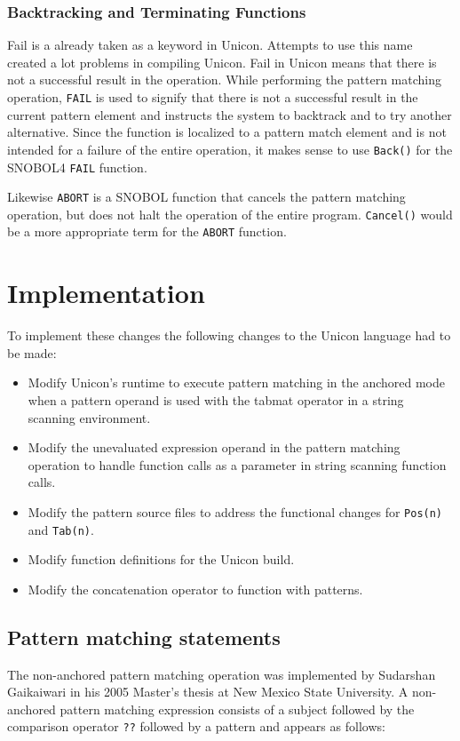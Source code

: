 \documentclass{article}
\begin{document}
\subsubsection{Backtracking and Terminating Functions}
Fail is a already taken as a keyword in Unicon.  Attempts to use this name created a lot problems in compiling Unicon.  Fail in Unicon means that there is not a successful result in the operation.  While performing the pattern matching operation, \texttt{FAIL} is used to signify that there is not a successful result in the current pattern element and instructs the system to backtrack and to try another alternative.  Since the function is localized to a pattern match element and is not intended for a failure of the entire operation, it makes sense to use \texttt{Back()} for the SNOBOL4 \texttt{FAIL} function.


Likewise \texttt{ABORT} is a SNOBOL function that cancels the pattern matching operation, but does not halt the operation of the entire program.  \texttt{Cancel()} would be a more appropriate term for the \texttt{ABORT} function.

\section{Implementation}
To implement these changes the following changes to the Unicon language had to be made:
\begin{itemize}
\item Modify Unicon's runtime to execute pattern matching in the anchored mode when a pattern operand is used with the tabmat operator in a string scanning environment.
\item Modify the unevaluated expression operand in the pattern matching operation to handle function calls as a parameter in string scanning function calls.
\item Modify the pattern source files to address the functional changes for \texttt{Pos(n)} and \texttt{Tab(n)}.
\item Modify function definitions for the Unicon build.
\item Modify the concatenation operator to function with patterns.
\end{itemize}

\subsection{Pattern matching statements}
The non-anchored pattern matching operation was implemented by Sudarshan Gaikaiwari in his 2005 Master's thesis at New Mexico State University.  A non-anchored pattern matching expression consists of a subject followed by the comparison operator \texttt{??} followed by a pattern and appears as follows:
\end{document}
